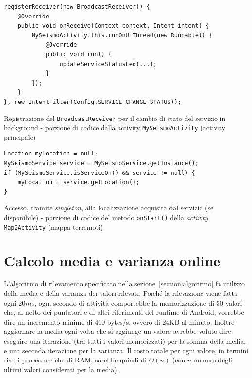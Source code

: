 \documentclass[a4paper,10pt]{memoir}
\begin{document}
\begin{listing}[h]
\begin{verbatim}
registerReceiver(new BroadcastReceiver() {
	@Override
	public void onReceive(Context context, Intent intent) {
		MySeismoActivity.this.runOnUiThread(new Runnable() {
			@Override
			public void run() {
				updateServiceStatusLed(...);
			}
		});
	}
}, new IntentFilter(Config.SERVICE_CHANGE_STATUS));
\end{verbatim}
\caption{Registrazione del \texttt{BroadcastReceiver} per il cambio di stato del servizio in background - porzione di codice dalla activity \texttt{MySeismoActivity} (activity principale)}
\end{listing}


\begin{listing}[h]
\begin{verbatim}
Location myLocation = null;
MySeismoService service = MySeismoService.getInstance();
if (MySeismoService.isServiceOn() && service != null) {
	myLocation = service.getLocation();
}
\end{verbatim}
\caption{Accesso, tramite \textit{singleton}, alla localizzazione acquisita dal servizio (se disponibile) - porzione di codice del metodo \texttt{onStart()} della \textit{activity} \texttt{Map2Activity} (mappa terremoti)}
\end{listing}

\section{Calcolo media e varianza online}
\label{section:onlinealg}

L'algoritmo di rilevamento specificato nella sezione~\ref{section:algoritmo} fa utilizzo della media e della varianza dei valori rilevati. Poiché la rilevazione viene fatta ogni $20ms$, ogni secondo di attività comportebbe la memorizzazione di 50 valori che, al netto dei puntatori e di altri riferimenti del runtime di Android, vorrebbe dire un incremento minimo di 400 bytes/s, ovvero di 24KB al minuto. Inoltre, aggiornare la media ogni volta che si aggiunge un valore avrebbe voluto dire eseguire una iterazione (tra tutti i valori memorizzati) per la somma della media, e una seconda iterazione per la varianza. Il costo totale per ogni valore, in termini sia di processore che di RAM, sarebbe quindi di $O(n)$ (con $n$ numero degli ultimi valori considerati per la media).
\end{document}
